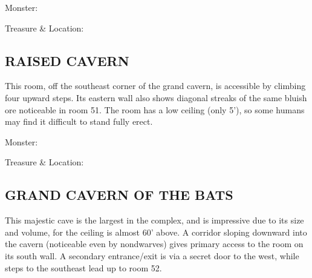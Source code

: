 \documentclass[letterpaper,sansserif,tightsqueeze]{module}
\begin{document}
Monster:

Treasure \& Location:

\subsection{RAISED CAVERN}
This room, off the southeast corner of
the grand cavern, is accessible by climbing four upward
steps. Its eastern wall also shows diagonal streaks of the
same bluish ore noticeable in room 51. The room has a low
ceiling (only 5'), so some humans may find it difficult to stand
fully erect.

Monster:

Treasure \& Location:

\subsection{GRAND CAVERN OF THE BATS}
This majestic cave is the
largest in the complex, and is impressive due to its size and
volume, for the ceiling is almost 60' above. A corridor sloping
downward into the cavern (noticeable even by nondwarves)
gives primary access to the room on its south wall.
A secondary entrance/exit is via a secret door to the west,
while steps to the southeast lead up to room 52.
\end{document}
